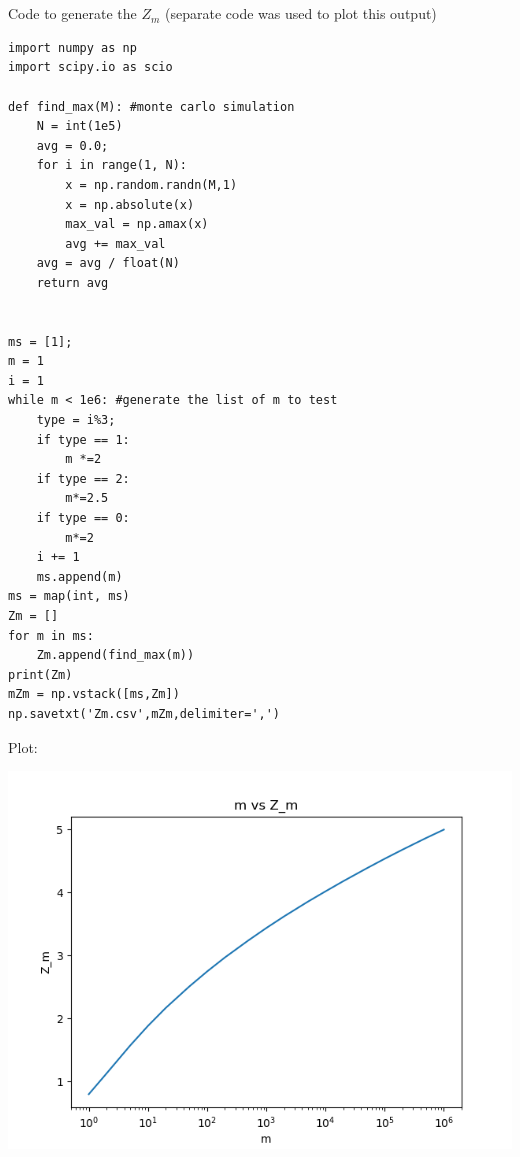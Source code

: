 \documentclass[]{article}
\begin{document}
\section{}
Code to generate the $Z_m$ (separate code was used to plot this output)
\begin{lstlisting}
import numpy as np
import scipy.io as scio

def find_max(M): #monte carlo simulation
	N = int(1e5)
	avg = 0.0;
	for i in range(1, N):
		x = np.random.randn(M,1)
		x = np.absolute(x)
		max_val = np.amax(x)
		avg += max_val
	avg = avg / float(N)
	return avg


ms = [1];
m = 1
i = 1
while m < 1e6: #generate the list of m to test
	type = i%3;
	if type == 1:
		m *=2
	if type == 2:
		m*=2.5
	if type == 0:
		m*=2
	i += 1
	ms.append(m)
ms = map(int, ms)
Zm = []
for m in ms:
	Zm.append(find_max(m))
print(Zm)
mZm = np.vstack([ms,Zm])
np.savetxt('Zm.csv',mZm,delimiter=',')
\end{lstlisting}
\newpage
Plot:
\FloatBarrier
{

\includegraphics[width=4 in]{"prob3"}
}\centering
\section{}
\end{document}
